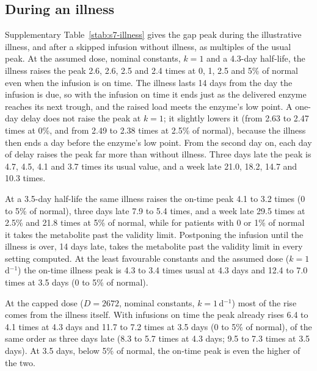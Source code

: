 \subsection{During an illness}
\label{si:s7:illness}

Supplementary Table~\ref{stab:s7-illness} gives the gap peak during the illustrative illness, and after
a skipped infusion without illness, as multiples of the usual peak. At the assumed dose, nominal
constants, $k=1$ and a 4.3-day half-life, the illness raises the peak 2.6, 2.6, 2.5 and 2.4 times at
0, 1, 2.5 and 5\% of normal even when the infusion is on time. The illness lasts 14 days from the day
the infusion is due, so with the infusion on time it ends just as the delivered enzyme reaches its next
trough, and the raised load meets the enzyme's low point. A one-day delay does not raise the peak at
$k=1$; it slightly lowers it (from 2.63 to 2.47 times at 0\%, and from 2.49 to 2.38 times at 2.5\% of
normal), because the illness then ends a day before the enzyme's low point. From the second day on,
each day of delay raises the peak far more than without illness. Three days late the peak is 4.7,
4.5, 4.1 and 3.7 times its usual value, and a week late 21.0, 18.2, 14.7 and 10.3 times.

At a 3.5-day half-life the same illness raises the on-time peak 4.1 to 3.2 times (0 to 5\% of normal),
three days late 7.9 to 5.4 times, and a week late 29.5 times at 2.5\% and 21.8 times at 5\% of normal,
while for patients with 0 or 1\% of normal it takes the metabolite past the validity limit.
Postponing the infusion until the illness is over, 14 days late, takes the metabolite past the
validity limit in every setting computed. At the least favourable constants and the assumed dose
($k=1$\,d$^{-1}$) the on-time illness peak is 4.3 to 3.4 times usual at 4.3 days and 12.4 to 7.0
times at 3.5 days (0 to 5\% of normal).

At the capped dose ($D=2672$\um, nominal constants, $k=1$\,d$^{-1}$) most of the rise comes from the
illness itself. With infusions on time the peak already rises 6.4 to 4.1 times at 4.3 days and 11.7
to 7.2 times at 3.5 days (0 to 5\% of normal), of the same order as three days late (8.3 to 5.7
times at 4.3 days; 9.5 to 7.3 times at 3.5 days). At 3.5 days, below 5\% of normal, the on-time
peak is even the higher of the two.

